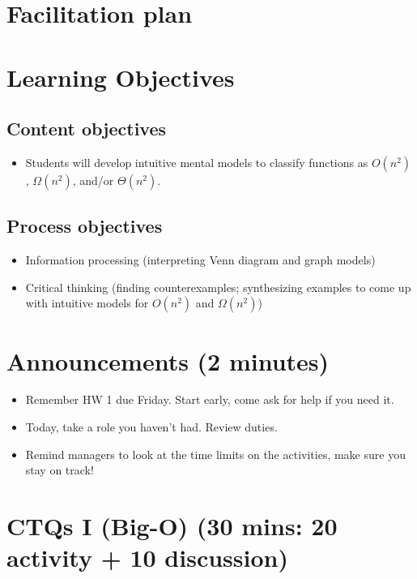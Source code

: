 \documentclass{tufte-handout}
\begin{document}
\newpage

\section{Facilitation plan}
\label{sec:facilitation}

\section{Learning Objectives}

\subsection{Content objectives}

\begin{itemize}
\item Students will develop intuitive mental models to classify
  functions as $O(n^2)$, $\Omega(n^2)$, and/or $\Theta(n^2)$.
\end{itemize}

\subsection{Process objectives}

\begin{itemize}
\item Information processing (interpreting Venn diagram and graph
  models)
\item Critical thinking (finding counterexamples; synthesizing
  examples to come up with intuitive models for $O(n^2)$ and $\Omega(n^2)$)
\end{itemize}

\section{Announcements (2 minutes)}

\begin{itemize}
\item Remember HW 1 due Friday.  Start early, come ask for help if you
  need it.
\item Today, take a role you haven't had.  Review duties.
\item Remind managers to look at the time limits on the activities,
  make sure you stay on track!
\end{itemize}

\section{CTQs I (Big-O) (30 mins: 20 activity + 10 discussion)}
\end{document}
